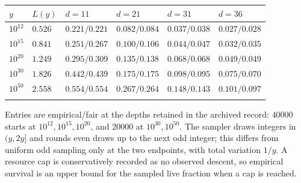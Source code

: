 \documentclass[11pt,a4paper]{article}
\begin{document}
\begingroup\small

\begin{longtable}[]{@{}
  >{\raggedright\arraybackslash}p{}
  >{\raggedright\arraybackslash}p{}
  >{\raggedright\arraybackslash}p{}
  >{\raggedright\arraybackslash}p{}
  >{\raggedright\arraybackslash}p{}
  >{\raggedright\arraybackslash}p{}@{}}
\toprule\noalign{}
\begin{minipage}[b]{\linewidth}\raggedright
\(y\)
\end{minipage} & \begin{minipage}[b]{\linewidth}\raggedright
\(L(y)\)
\end{minipage} & \begin{minipage}[b]{\linewidth}\raggedright
\(d=11\)
\end{minipage} & \begin{minipage}[b]{\linewidth}\raggedright
\(d=21\)
\end{minipage} & \begin{minipage}[b]{\linewidth}\raggedright
\(d=31\)
\end{minipage} & \begin{minipage}[b]{\linewidth}\raggedright
\(d=36\)
\end{minipage} \\
\midrule\noalign{}
\endhead
\bottomrule\noalign{}
\endfoot
\bottomrule\noalign{}
\endlastfoot
\(10^{12}\) & \(0.526\) & \(0.221/0.221\) & \(0.082/0.084\) &
\(0.037/0.038\) & \(0.027/0.028\) \\
\(10^{15}\) & \(0.841\) & \(0.251/0.267\) & \(0.100/0.106\) &
\(0.044/0.047\) & \(0.032/0.035\) \\
\(10^{20}\) & \(1.249\) & \(0.295/0.309\) & \(0.135/0.138\) &
\(0.068/0.068\) & \(0.049/0.049\) \\
\(10^{30}\) & \(1.826\) & \(0.442/0.439\) & \(0.175/0.175\) &
\(0.098/0.095\) & \(0.075/0.070\) \\
\(10^{50}\) & \(2.558\) & \(0.554/0.554\) & \(0.267/0.264\) &
\(0.148/0.143\) & \(0.101/0.097\) \\*
\end{longtable}

\endgroup

Entries are empirical/fair at the depths retained in the archived
record: \(40000\) starts at \(10^{12},10^{15},10^{20}\), and \(20000\)
at \(10^{30},10^{50}\). The sampler draws integers in \((y,2y]\) and
rounds even draws up to the next odd integer; this differs from uniform
odd sampling only at the two endpoints, with total variation \(1/y\). A
resource cap is conservatively recorded as no observed descent, so
empirical survival is an upper bound for the sampled live fraction when
a cap is reached.
\end{document}
